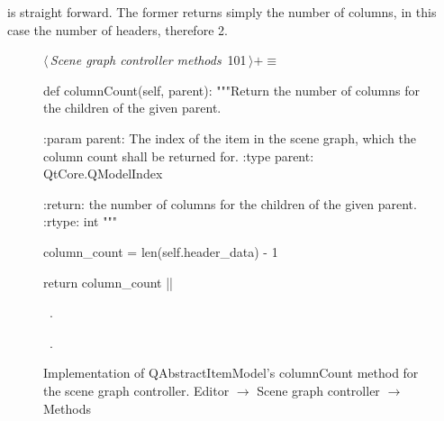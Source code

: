 \documentclass[%
    a4paper,    %
    justified,  %
    nobib,      %
    openany     %
]{tufte-book}
\makeatletter
\renewcommand{\label}[1]{\@tufte@label{##1}}%
\makeatother
\begin{document}
 is straight
forward. The former returns simply the number of columns, in this case the
number of headers, therefore 2.

\begin{figure}[!htbp]
\begin{flushleft} \small
\begin{minipage}{\linewidth}\label{scrap32}\raggedright\small
{} $\langle\,${\itshape Scene graph controller methods}\nobreak\ {\footnotesize {101}}$\,\rangle+\equiv$
\vspace{-1ex}
\begin{pythoncode}
def columnCount(self, parent):
    """Return the number of columns for the children of the given
    parent.

    :param parent: The index of the item in the scene graph, which
                   the column count shall be returned for.
    :type  parent: QtCore.QModelIndex

    :return: the number of columns for the children of the given
             parent.
    :rtype:  int
    """

    column_count = len(self.header_data) - 1

    return column_count
|\NWsep|
\end{pythoncode}
\vspace{1.5ex}
\footnotesize
\begin{list}{}{\setlength{\itemsep}{-\parsep}\setlength{\itemindent}{-\leftmargin}}
\item \NWtxtMacroDefBy\ .
\item \NWtxtMacroRefIn\ .

\item{}
\end{list}
\end{minipage}\vspace{4ex}
\end{flushleft}
\caption{Implementation of QAbstractItemModel's columnCount method for the scene
  graph controller.
  \newline{}\newline{}Editor $\rightarrow$ Scene graph controller $\rightarrow$
  Methods}
\end{figure}
\end{document}
